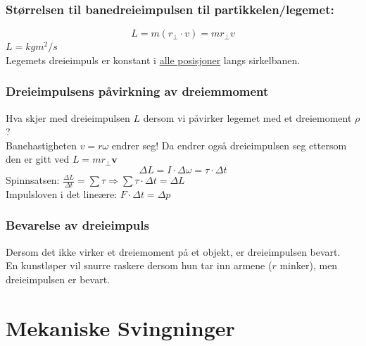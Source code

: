 \documentclass[12pt]{article}
\begin{document}
\subsubsection{Størrelsen til banedreieimpulsen til partikkelen/legemet:}
$$L = m(r_{\perp}\cdot v) = mr_{\perp}v$$
$L = kgm^2/s$\\
Legemets dreieimpuls er konstant i \underline{alle posisjoner} langs sirkelbanen.

\subsubsection{Dreieimpulsens påvirkning av dreiemmoment}
Hva skjer med dreieimpulsen $L$ dersom vi påvirker legemet med et dreiemoment $\rho$?\\
Banehastigheten $v = r\omega$ endrer seg! Da endrer også dreieimpulsen seg ettersom den er gitt ved $L = mr_\perp \textbf{v}$\\

$$\Delta L = I\cdot\Delta \omega = \tau \cdot \Delta t$$
Spinnsatsen: $\frac{\Delta L}{\Delta t} = \sum \tau \Rightarrow \sum \tau\cdot\Delta t = \Delta L$\\
\bigskip
Impulsloven i det lineære: $F\cdot \Delta t = \Delta p$

\subsubsection{Bevarelse av dreieimpuls}
Dersom det ikke virker et dreiemoment på et objekt, er dreieimpulsen bevart.\\
En kunstløper vil snurre raskere dersom hun tar inn armene ($r$ minker), men dreieimpulsen er bevart.

\section{Mekaniske Svingninger}
\end{document}
